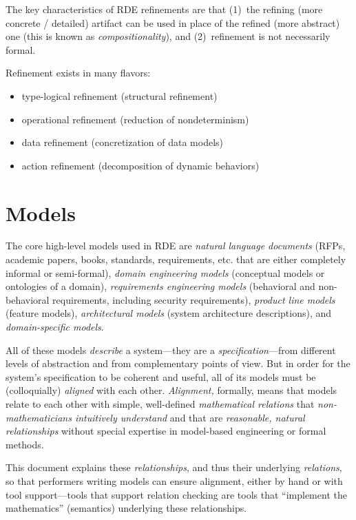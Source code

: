 \documentclass[10pt,letterpaper]{article}
\begin{document}
The key characteristics of RDE refinements are that (1)~the refining (more concrete / detailed) artifact can be used in place of the refined (more abstract) one (this is known as \emph{compositionality}), and (2)~refinement is not necessarily formal.

Refinement exists in many flavors:
\begin{itemize}
  \item type-logical refinement (structural refinement)
  \item operational refinement (reduction of nondeterminism)
  \item data refinement (concretization of data models)
  \item action refinement (decomposition of dynamic behaviors)
\end{itemize}

\section{Models}
\label{models}

The core high-level models used in RDE are \emph{natural language documents} (RFPs, academic papers, books, standards, requirements, etc. that are either completely informal or semi-formal), \emph{domain engineering models} (conceptual models or ontologies of a domain), \emph{requirements engineering models} (behavioral and non-behavioral requirements, including security requirements), \emph{product line models} (feature models), \emph{architectural models} (system architecture descriptions), and \emph{domain-specific models}.

All of these models \emph{describe} a system---they are a \emph{specification}---from different levels of abstraction and from complementary points of view. But in order for the system's specification to be coherent and useful, all of its models must be (colloquially) \emph{aligned} with each other. \emph{Alignment,} formally, means that models relate to each other with simple, well-defined \emph{mathematical relations} that \emph{non-mathematicians intuitively understand} and that are \emph{reasonable, natural relationships} without special expertise in model-based engineering or formal methods.

This document explains these \emph{relationships}, and thus their underlying \emph{relations}, so that performers writing models can ensure alignment, either by hand or with tool support---tools that support relation checking are tools that ``implement the mathematics'' (semantics) underlying these relationships.
\end{document}
